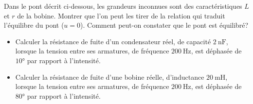 \begin{exercice}
  Dans le pont décrit ci-dessous, les grandeurs inconnues sont des 
  caractéristiques \(L\) et \(r\) de la bobine. Montrer que l'on peut les 
  tirer de la relation qui traduit l'équilibre du pont (\(u=0\)). Comment 
  peut-on constater que le pont est équilibré?
\end{exercice}
\begin{exercice}
  \begin{itemize}
    \item Calculer la résistance de fuite d'un condensateur réel, de capacité 
      \(\SI{2}{\nano\farad}\), lorsque la tension entre ses armatures, de 
      fréquence \(\SI{200}{\hertz}\), est déphasée de \(\ang{10}\) par 
      rapport à l'intensité.
    \item Calculer la résistance de fuite d'une bobine réelle, d'inductance 
      \(\SI{20}{\milli\henry}\), lorsque la tension entre ses armatures, de 
      fréquence \(\SI{200}{\hertz}\), est déphasée de \(\ang{80}\) par 
      rapport à l'intensité.
  \end{itemize}
\end{exercice}

